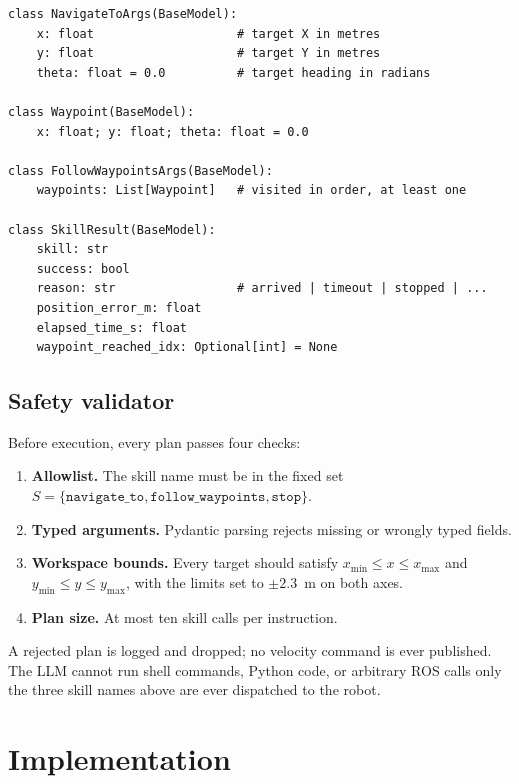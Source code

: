 \documentclass[11pt]{article}
\begin{document}
\begin{lstlisting}[caption={Skill argument and result contracts.},label={lst:contracts}]
class NavigateToArgs(BaseModel):
    x: float                    # target X in metres
    y: float                    # target Y in metres
    theta: float = 0.0          # target heading in radians

class Waypoint(BaseModel):
    x: float; y: float; theta: float = 0.0

class FollowWaypointsArgs(BaseModel):
    waypoints: List[Waypoint]   # visited in order, at least one

class SkillResult(BaseModel):
    skill: str
    success: bool
    reason: str                 # arrived | timeout | stopped | ...
    position_error_m: float
    elapsed_time_s: float
    waypoint_reached_idx: Optional[int] = None
\end{lstlisting}

\subsection{Safety validator}
Before execution, every plan passes four checks:

\begin{enumerate}
  \item \textbf{Allowlist.} The skill name must be in the fixed set
  $S=\{\texttt{navigate\_to},\texttt{follow\_waypoints},\texttt{stop}\}$.
  \item \textbf{Typed arguments.} Pydantic parsing rejects missing or wrongly typed
  fields.
  \item \textbf{Workspace bounds.} Every target should satisfy
  $x_{\min}\le x\le x_{\max}$ and $y_{\min}\le y\le y_{\max}$, with the limits
  set to $\pm 2.3$~m on both axes.
  \item \textbf{Plan size.} At most ten skill calls per instruction.
\end{enumerate}

A rejected plan is logged and dropped; no velocity command is ever published.
The LLM cannot run shell commands, Python code, or arbitrary ROS calls only
the three skill names above are ever dispatched to the robot.

\section{Implementation}
\end{document}
